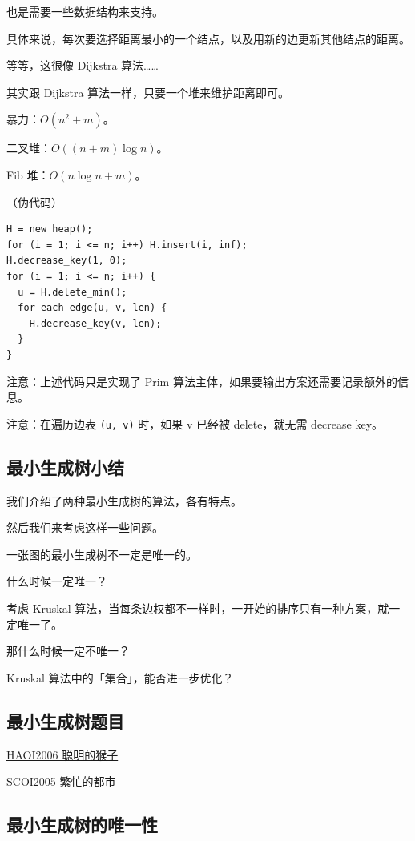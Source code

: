 也是需要一些数据结构来支持。

具体来说，每次要选择距离最小的一个结点，以及用新的边更新其他结点的距离。

等等，这很像 Dijkstra 算法……

其实跟 Dijkstra 算法一样，只要一个堆来维护距离即可。

暴力：$O(n^2+m)$。

二叉堆：$O((n+m) \log n)$。

Fib 堆：$O(n \log n + m)$。

（伪代码）

\begin{verbatim}
H = new heap();
for (i = 1; i <= n; i++) H.insert(i, inf);
H.decrease_key(1, 0);
for (i = 1; i <= n; i++) {
  u = H.delete_min();
  for each edge(u, v, len) {
    H.decrease_key(v, len);
  }
}
\end{verbatim}

注意：上述代码只是实现了 Prim 算法主体，如果要输出方案还需要记录额外的信息。

注意：在遍历边表 \texttt{(u, v)} 时，如果 v 已经被 delete，就无需 decrease key。

\subsection{最小生成树小结}

我们介绍了两种最小生成树的算法，各有特点。

然后我们来考虑这样一些问题。

一张图的最小生成树不一定是唯一的。

什么时候一定唯一？

考虑 Kruskal 算法，当每条边权都不一样时，一开始的排序只有一种方案，就一定唯一了。

那什么时候一定不唯一？

Kruskal 算法中的「集合」，能否进一步优化？

\subsection{最小生成树题目}

\href{https://www.lydsy.com/JudgeOnline/problem.php?id=2429}{ HAOI2006 聪明的猴子}

\href{https://www.lydsy.com/JudgeOnline/problem.php?id=1083}{ SCOI2005 繁忙的都市}

\subsection{最小生成树的唯一性}

